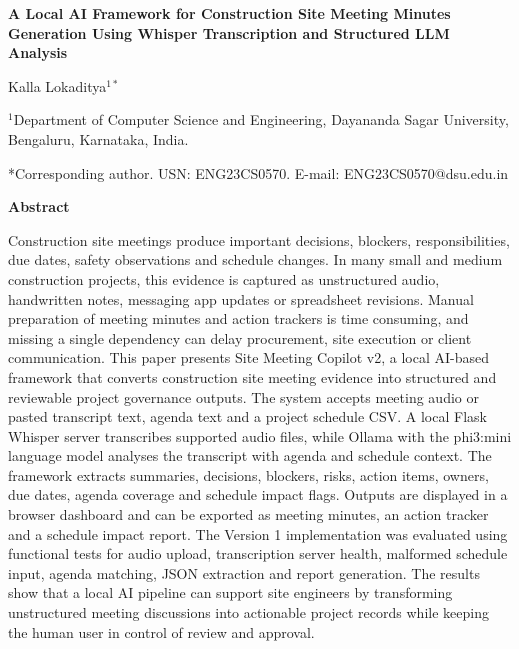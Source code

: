 \documentclass[11pt,a4paper]{article}
\begin{document}
\begin{center}
    \vspace*{1.1cm}
    {\LARGE\bfseries A Local AI Framework for Construction Site Meeting Minutes Generation Using Whisper Transcription and Structured LLM Analysis\par}
    \vspace{1.0cm}
    {\large Kalla Lokaditya$^{1*}$\par}
    \vspace{0.55cm}
    {$^{1}$Department of Computer Science and Engineering, Dayananda Sagar University, Bengaluru, Karnataka, India.\par}
    \vspace{0.25cm}
    {*Corresponding author. USN: ENG23CS0570. E-mail: ENG23CS0570@dsu.edu.in\par}
\end{center}

\vspace{1.1cm}

\begin{center}
    \textbf{Abstract}
\end{center}

\noindent Construction site meetings produce important decisions, blockers, responsibilities, due dates, safety observations and schedule changes. In many small and medium construction projects, this evidence is captured as unstructured audio, handwritten notes, messaging app updates or spreadsheet revisions. Manual preparation of meeting minutes and action trackers is time consuming, and missing a single dependency can delay procurement, site execution or client communication. This paper presents Site Meeting Copilot v2, a local AI-based framework that converts construction site meeting evidence into structured and reviewable project governance outputs. The system accepts meeting audio or pasted transcript text, agenda text and a project schedule CSV. A local Flask Whisper server transcribes supported audio files, while Ollama with the phi3:mini language model analyses the transcript with agenda and schedule context. The framework extracts summaries, decisions, blockers, risks, action items, owners, due dates, agenda coverage and schedule impact flags. Outputs are displayed in a browser dashboard and can be exported as meeting minutes, an action tracker and a schedule impact report. The Version 1 implementation was evaluated using functional tests for audio upload, transcription server health, malformed schedule input, agenda matching, JSON extraction and report generation. The results show that a local AI pipeline can support site engineers by transforming unstructured meeting discussions into actionable project records while keeping the human user in control of review and approval.
\end{document}
